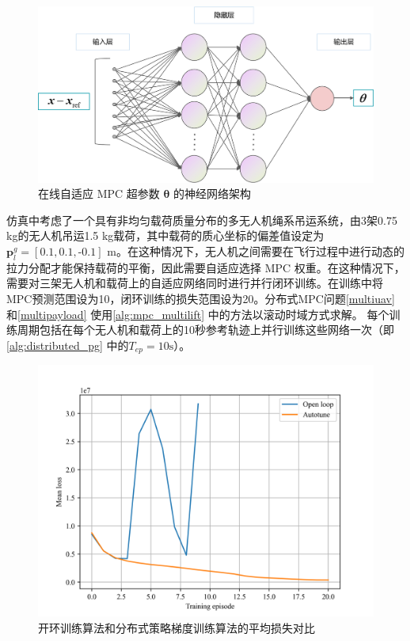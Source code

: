 \documentclass[lang=chs, degree=master, blindreview=false, winfonts=true]{yanputhesis}
\begin{document}
\begin{figure}[hbt!]
	\centering
	\includegraphics[width=30pc]{picture/kk/图片3.png} 
	\caption{在线自适应 MPC 超参数 $\bm \theta$ 的神经网络架构} 
	\label{network}
\end{figure}
仿真中考虑了一个具有非均匀载荷质量分布的多无人机绳系吊运系统，由3架0.75 kg的无人机吊运1.5 kg载荷，其中载荷的质心坐标的偏差值设定为 $\bm p_{l}^g=[\text{0.1},\text{0.1},\text{-0.1}]$ m。在这种情况下，无人机之间需要在飞行过程中进行动态的拉力分配才能保持载荷的平衡，因此需要自适应选择 MPC 权重。在这种情况下，需要对三架无人机和载荷上的自适应网络同时进行并行闭环训练。在训练中将MPC预测范围设为10，闭环训练的损失范围设为20。分布式MPC问题\autoref{multiuav} 和\autoref{multipayload} 使用\autoref{alg:mpc_multilift} 中的方法以滚动时域方式求解。
每个训练周期包括在每个无人机和载荷上的10秒参考轨迹上并行训练这些网络一次（即\autoref{alg:distributed_pg} 中的$T_{ep}= \text{10s}$）。

\begin{figure}[hbt!]
	\centering
	\includegraphics[width=30pc]{picture/kk/Mean_loss_cln.png} 
	\caption{开环训练算法和分布式策略梯度训练算法的平均损失对比} 
	\label{meanloss}
\end{figure}
\end{document}
